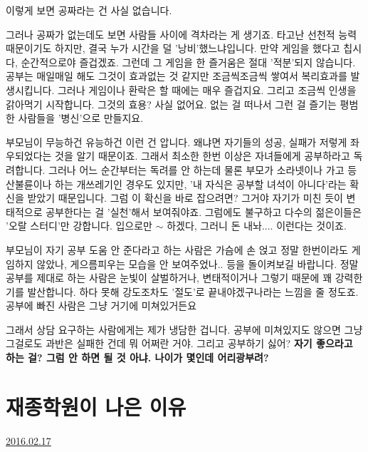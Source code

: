 이렇게 보면 공짜라는 건 사실 없습니다.
\vspace{5mm}

그러나 공짜가 없는데도 보면 사람들 사이에 격차라는 게 생기죠.
타고난 선천적 능력 때문이기도 하지만, 결국 누가 시간을 덜 '낭비'했느냐입니다.
만약 게임을 했다고 칩시다, 순간적으로야 즐겁겠죠. 그런데 그 게임을 한 즐거움은 절대 '적분'되지 않습니다.
공부는 매일매일 해도 그것이 효과없는 것 같지만 조금씩조금씩 쌓여서 복리효과를 발생시킵니다.
그러나 게임이나 환락은 할 때에는 매우 즐겁지요. 그리고 조금씩 인생을 갉아먹기 시작합니다. 그것의 효용? 사실 없어요.
없는 걸 떠나서 그런 걸 즐기는 평범한 사람들을 '병신'으로 만들지요.
\vspace{5mm}

부모님이 무능하건 유능하건 이런 건 압니다. 왜냐면 자기들의 성공, 실패가 저렇게 좌우되었다는 것을 알기 때문이죠.
그래서 최소한 한번 이상은 자녀들에게 공부하라고 독려합니다.
그러나 어느 순간부터는 독려를 안 하는데 물론 부모가 소라넷이나 가고 등산불륜이나 하는 개쓰레기인 경우도 있지만,
'내 자식은 공부할 녀석이 아니다'라는 확신을 받았기 때문입니다.
그럼 이 확신을 바로 잡으려면? 그거야 자기가 미친 듯이 변태적으로 공부한다는 걸 '실천'해서 보여줘야죠.
그럼에도 불구하고 다수의 젊은이들은 '오랄 스터디'만 강합니다. 입으로만 $\sim$ 하겠다, 그러니 돈 내놔.... 이런다는 것이죠.
\vspace{5mm}

부모님이 자기 공부 도움 안 준다라고 하는 사람은 가슴에 손 얹고
정말 한번이라도 게임하지 않았나, 게으름피우는 모습을 안 보여주었나.. 등을 돌이켜보길 바랍니다.
정말 공부를 제대로 하는 사람은 눈빛이 살벌하거나, 변태적이거나 그렇기 때문에 꽤 강력한 기를 발산합니다.
하다 못해 강도조차도 '절도'로 끝내야겠구나라는 느낌을 줄 정도죠. 공부에 빠진 사람은 그냥 거기에 미쳐있거든요
\vspace{5mm}

그래서 상담 요구하는 사람에게는 제가 냉담한 겁니다. 공부에 미쳐있지도 않으면 그냥 그걸로도 과반은 실패한 건데 뭐 어쩌란 거야.
그리고 공부하기 싫어? \textbf{자기 좋으라고 하는 걸? 그럼 안 하면 될 것 아냐. 나이가 몇인데 어리광부려?}
\vspace{5mm}







\section{재종학원이 나은 이유}
\href{https://www.kockoc.com/Apoc/640034}{2016.02.17}

